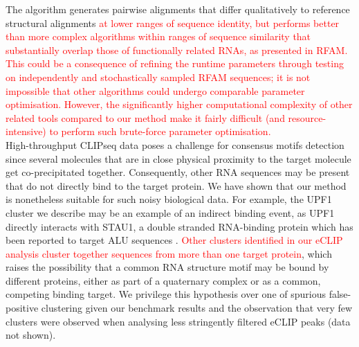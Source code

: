 \documentclass{bmcart}
\begin{document}
The algorithm generates pairwise alignments that differ qualitatively to reference structural
alignments \textcolor{red} { at lower ranges of sequence identity, but performs better than more 
complex algorithms within ranges of sequence similarity that substantially overlap 
those of functionally related RNAs, as presented in RFAM.  
This could be a consequence of refining the runtime parameters through testing  on 
independently and stochastically sampled RFAM sequences; it is not 
impossible that other algorithms could undergo comparable parameter optimisation.
However, the significantly higher computational complexity of other related tools compared to our method make it fairly difficult (and resource-intensive) to perform such brute-force parameter optimisation. }\\

High-throughput CLIPseq data poses a challenge for consensus motifs detection since
several molecules that are in close physical proximity to the target molecule get 
co-precipitated together. Consequently, other RNA sequences may be present 
that do not directly bind to the target protein. We have shown that our 
 method is nonetheless suitable for such noisy biological data. For example, 
 the UPF1 cluster we describe may be an example of an indirect binding event, 
 as UPF1 directly interacts with STAU1, a double stranded RNA-binding protein which has 
been reported to target ALU sequences \cite{gong2011lncrnas}. \textcolor{red}{Other clusters identified in our eCLIP analysis cluster together sequences from more than one target protein}, which raises the possibility 
that a common RNA structure motif may be bound by different proteins, either
as part of a quaternary complex or as a common, competing binding target. 
We privilege this hypothesis over one of spurious false-positive clustering 
given our benchmark results and the observation that very few clusters
were observed when analysing less stringently filtered eCLIP peaks (data not shown). \\
\end{document}
